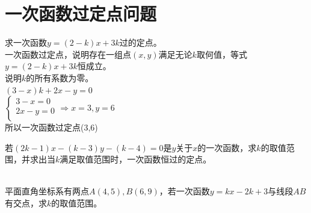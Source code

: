 \documentclass{ecnuthesis}
\begin{document}
\section{一次函数过定点问题}
\begin{example}
    求一次函数$y=(2-k)x+3k$过的定点。 \\
    一次函数过定点，说明存在一组点$(x,y)$满足无论$k$取何值，等式$y=(2-k)x+3k$恒成立。 \\
    说明$k$的所有系数为零。 \\
    $(3-x)k+2x-y=0$ \\
    $\begin{cases} 3-x=0 \\ 2x-y=0 \\ \end{cases} \Rightarrow x=3,y=6$ \\
    所以一次函数过定点(3,6)
\end{example}
\begin{problem}
    若$(2k−1)x−(k−3)y−(k−4)=0$是$y$关于$x$的一次函数，求$k$的取值范围，并求出当$k$满足取值范围时，一次函数恒过的定点。\\
    \\
\end{problem}
\begin{problem}
    平面直角坐标系有两点$A(4,5),B(6,9)$，若一次函数$y=kx−2k+3$与线段$AB$有交点，求$k$的取值范围。\\
    \\
\end{problem}
\clearpage
\end{document}
